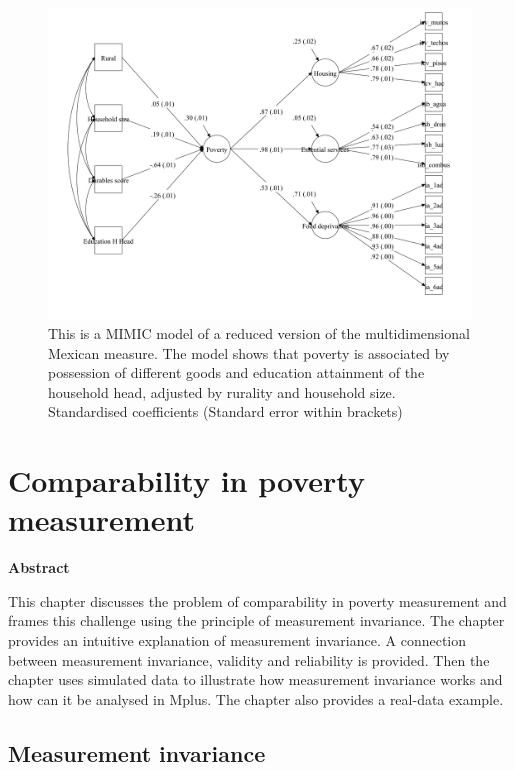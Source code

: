 \documentclass[]{book}
\begin{document}
\begin{figure}[H]

{\centering \includegraphics[width=\textwidth]{val_cfa_mex} 

}

\caption{This is a MIMIC model of a reduced version of the multidimensional Mexican measure. The model shows that poverty is associated by possession of different goods and education attainment of the household head, adjusted by rurality and household size. Standardised coefficients (Standard error within brackets)}\label{fig:valcfamex}
\end{figure}

\hypertarget{Chapter-5}{%
\chapter{Comparability in poverty measurement}\label{Chapter-5}}

\textbf{Abstract}

This chapter discusses the problem of comparability in poverty measurement and frames this challenge using the principle of measurement invariance. The chapter provides an intuitive explanation of measurement invariance. A connection between measurement invariance, validity and reliability is provided. Then the chapter uses simulated data to illustrate how measurement invariance works and how can it be analysed in Mplus. The chapter also provides a real-data example.

\hypertarget{measurement-invariance}{%
\section{Measurement invariance}\label{measurement-invariance}}
\end{document}
